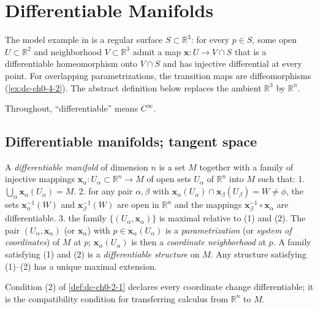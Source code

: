 \chapter{Differentiable Manifolds}
\label{chap:dc-differentiable-manifolds}

The model example in \cite{doCarmo} is a regular surface $S\subset\mathbb{R}^3$:
for every $p\in S$, some open $U\subset\mathbb{R}^2$ and neighborhood
$V\subset\mathbb{R}^3$ admit a map
$\mathbf{x}:U\to V\cap S$ that is a differentiable homeomorphism onto $V\cap S$ and
has injective differential at every point. For overlapping parametrizations, the
transition maps are diffeomorphisms (\cref{ex:dc-ch0-4-2}). The abstract definition
below replaces the ambient $\mathbb{R}^3$ by $\mathbb{R}^n$.

Throughout, ``differentiable'' means $C^\infty$.

\section{Differentiable manifolds; tangent space}

\begin{definition}
  \label{def:dc-ch0-2-1}


  A \emph{differentiable manifold} of dimension $n$ is a set $M$ together with a family
  of injective mappings $\mathbf{x}_\alpha:U_\alpha\subset\mathbb{R}^n\to M$ of open
  sets $U_\alpha$ of $\mathbb{R}^n$ into $M$ such that:
  1. $\bigcup_\alpha\mathbf{x}_\alpha(U_\alpha)=M$.
  2. for any pair $\alpha,\beta$ with
     $\mathbf{x}_\alpha(U_\alpha)\cap\mathbf{x}_\beta(U_\beta)=W\neq\phi$, the sets
     $\mathbf{x}_\alpha^{-1}(W)$ and $\mathbf{x}_\beta^{-1}(W)$ are open in
     $\mathbb{R}^n$ and the mappings $\mathbf{x}_\beta^{-1}\circ\mathbf{x}_\alpha$
     are differentiable.
  3. the family $\{(U_\alpha,\mathbf{x}_\alpha)\}$ is maximal relative to (1) and (2).
  The pair $(U_\alpha,\mathbf{x}_\alpha)$ (or $\mathbf{x}_\alpha$) with
  $p\in\mathbf{x}_\alpha(U_\alpha)$ is a \emph{parametrization} (or \emph{system of
  coordinates}) of $M$ at $p$; $\mathbf{x}_\alpha(U_\alpha)$ is then a \emph{coordinate
  neighborhood} at $p$. A family satisfying (1) and (2) is a \emph{differentiable
  structure} on $M$. Any structure satisfying (1)--(2) has a unique maximal extension.
\end{definition}

\begin{remark}
  \label{rem:dc-ch0-2-2}


  Condition (2) of \cref{def:dc-ch0-2-1} declares every coordinate change
  differentiable; it is the
  compatibility condition for transferring calculus from $\mathbb{R}^n$ to $M$.
\end{remark}

